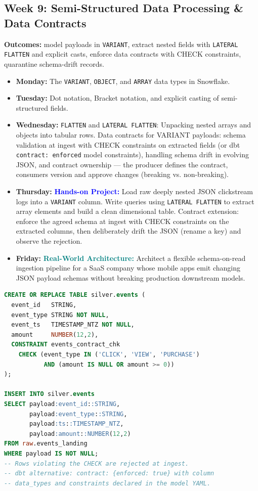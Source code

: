 \documentclass[11pt, a4paper]{article}
\newcommand{\project}[1]{\textbf{\textcolor{blue}{Hands-on Project:}} #1}
\newcommand{\usecase}[1]{\textbf{\textcolor{teal}{Real-World Architecture:}} #1}
\newcommand{\dayitem}[2]{\item \textbf{#1:} #2}
\begin{document}
\subsection*{Week 9: Semi-Structured Data Processing \& Data Contracts}
\par\noindent\textbf{Outcomes:} model payloads in \texttt{VARIANT}, extract nested fields with \texttt{LATERAL FLATTEN} and explicit casts, enforce data contracts with CHECK constraints, quarantine schema-drift records.
\begin{itemize}[label=-]
    \dayitem{Monday}{The \texttt{VARIANT}, \texttt{OBJECT}, and \texttt{ARRAY} data types in Snowflake.}
    \dayitem{Tuesday}{Dot notation, Bracket notation, and explicit casting of semi-structured fields.}
    \dayitem{Wednesday}{\texttt{FLATTEN} and \texttt{LATERAL FLATTEN}: Unpacking nested arrays and objects into tabular rows. Data contracts for VARIANT payloads: schema validation at ingest with CHECK constraints on extracted fields (or dbt \texttt{contract: enforced} model constraints), handling schema drift in evolving JSON, and contract ownership --- the producer defines the contract, consumers version and approve changes (breaking vs. non-breaking).}
    \dayitem{Thursday}{\project{Load raw deeply nested JSON clickstream logs into a \texttt{VARIANT} column. Write queries using \texttt{LATERAL FLATTEN} to extract array elements and build a clean dimensional table. Contract extension: enforce the agreed schema at ingest with CHECK constraints on the extracted columns, then deliberately drift the JSON (rename a key) and observe the rejection.}}
    \dayitem{Friday}{\usecase{Architect a flexible schema-on-read ingestion pipeline for a SaaS company whose mobile apps emit changing JSON payload schemas without breaking production downstream models.}}
\end{itemize}
\begin{lstlisting}[language=SQL, caption={Contract enforcement on extracted VARIANT fields}]
CREATE OR REPLACE TABLE silver.events (
  event_id   STRING,
  event_type STRING NOT NULL,
  event_ts   TIMESTAMP_NTZ NOT NULL,
  amount     NUMBER(12,2),
  CONSTRAINT events_contract_chk
    CHECK (event_type IN ('CLICK', 'VIEW', 'PURCHASE')
           AND (amount IS NULL OR amount >= 0))
);

INSERT INTO silver.events
SELECT payload:event_id::STRING,
       payload:event_type::STRING,
       payload:ts::TIMESTAMP_NTZ,
       payload:amount::NUMBER(12,2)
FROM raw.events_landing
WHERE payload IS NOT NULL;
-- Rows violating the CHECK are rejected at ingest.
-- dbt alternative: contract: {enforced: true} with column
-- data_types and constraints declared in the model YAML.
\end{lstlisting}
\end{document}
